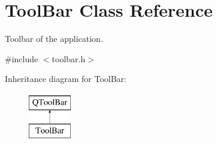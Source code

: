 \hypertarget{classToolBar}{}\section{Tool\+Bar Class Reference}
\label{classToolBar}


Toolbar of the application.  




{\ttfamily \#include $<$toolbar.\+h$>$}

Inheritance diagram for Tool\+Bar\+:\begin{figure}[H]
\begin{center}
\leavevmode
\includegraphics[height=2.000000cm]{classToolBar}
\end{center}
\end{figure}
